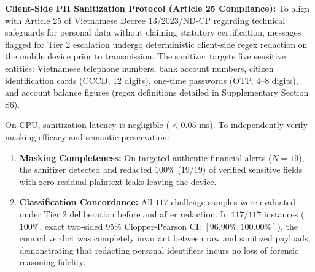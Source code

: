 \documentclass[journal]{IEEEtran}
\begin{document}
\begin{table}[h]
\centering
\caption{Structured Specification Summary Across Evaluated Prompt Suites}
\label{tab:prompt_summary}
\renewcommand{\arraystretch}{0.92}
\end{table}

\textbf{Client-Side PII Sanitization Protocol (Article 25 Compliance):} To align with Article 25 of Vietnamese Decree 13/2023/ND-CP regarding technical safeguards for personal data without claiming statutory certification, messages flagged for Tier 2 escalation undergo deterministic client-side regex redaction on the mobile device prior to transmission. The sanitizer targets five sensitive entities: Vietnamese telephone numbers, bank account numbers, citizen identification cards (CCCD, 12 digits), one-time passwords (OTP, 4--8 digits), and account balance figures (regex definitions detailed in Supplementary Section S6). 

On CPU, sanitization latency is negligible ($< 0.05\text{ ms}$). To independently verify masking efficacy and semantic preservation:
\begin{enumerate}
    \item \textbf{Masking Completeness:} On targeted authentic financial alerts ($N=19$), the sanitizer detected and redacted $100\%$ ($19/19$) of verified sensitive fields with zero residual plaintext leaks leaving the device.
    \item \textbf{Classification Concordance:} All $117$ challenge samples were evaluated under Tier 2 deliberation before and after redaction. In $117 / 117$ instances ($100\%$, exact two-sided 95\% Clopper-Pearson CI: $[96.90\%, 100.00\%]$), the council verdict was completely invariant between raw and sanitized payloads, demonstrating that redacting personal identifiers incurs no loss of forensic reasoning fidelity.
\end{enumerate}
\end{document}
